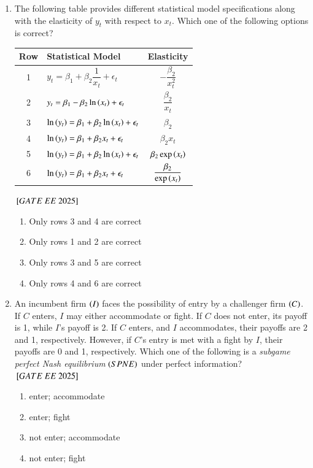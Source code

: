 \documentclass[journal,12pt,onecolumn]{IEEEtran}
\theoremstyle{remark}
\begin{document}
\begin{enumerate}
\item The following table provides different statistical model specifications along with the elasticity of $y_t$ with respect to $x_t$. Which one of the following options is correct?

\begin{center}
\begin{tabular}{|c|l|c|}
\hline
Row & Statistical Model & Elasticity \\
\hline
1 & $y_t = \beta_1 + \beta_2 \dfrac{1}{x_t} + \epsilon_t$ & $-\dfrac{\beta_2}{x_t^2}$ \\
2 & $y_t = \beta_1 - \beta_2 \ln \left(x_t\right) + \epsilon_t$ & $\dfrac{\beta_2}{x_t}$ \\
3 & $\ln \left(y_t\right) = \beta_1 + \beta_2 \ln \left(x_t\right) + \epsilon_t $ & $\beta_2$ \\
4 & $\ln \left(y_t\right) = \beta_1 + \beta_2 x_t + \epsilon_t$ & $\beta_2 x_t$ \\
5 & $\ln \left(y_t\right) = \beta_1 + \beta_2 \ln \left(x_t\right) + \epsilon_t $ & $\beta_2 \exp \left(x_t\right)$ \\
6 & $\ln \left(y_t\right) = \beta_1 + \beta_2 x_t + \epsilon_t$ & $\dfrac{\beta_2}{\exp \left(x_t\right)}$ \\
\hline
\end{tabular}
\end{center}
${}\left[GATE\ EE\ 2025\right]$\\
\begin{enumerate}[label=(\Alph*)]
\item Only rows 3 and 4 are correct
\item Only rows 1 and 2 are correct
\item Only rows 3 and 5 are correct
\item Only rows 4 and 6 are correct
\end{enumerate}
 
\item An incumbent firm $\left(I\right)$ faces the possibility of entry by a challenger firm $\left(C\right)$. If $C$ enters, $I$ may either accommodate or fight. If $C$ does not enter, its payoff is 1, while $I$'s payoff is 2. If $C$ enters, and $I$ accommodates, their payoffs are 2 and 1, respectively. However, if $C$'s entry is met with a fight by $I$, their payoffs are 0 and 1, respectively. Which one of the following is a \textit{subgame perfect Nash equilibrium} $\left(SPNE\right)$ under perfect information?
${}\left[GATE\ EE\ 2025\right]$\\
\begin{enumerate}[label=(\Alph*)]
\item enter; accommodate
\item enter; fight
\item not enter; accommodate
\item not enter; fight
\end{enumerate}
 

\end{enumerate}
\end{document}
